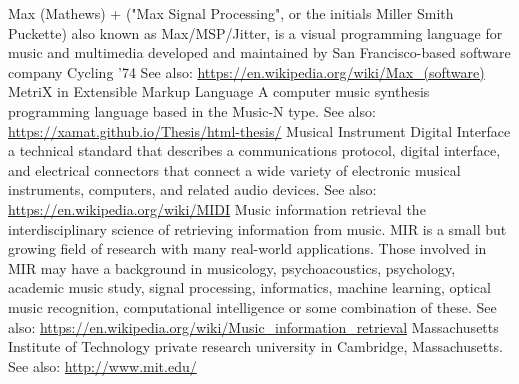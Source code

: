 	{Max (Mathews) + ("Max Signal Processing", or the initials Miller Smith Puckette)}
	{also known as Max/MSP/Jitter, is a visual programming language for music and multimedia developed and maintained by San Francisco-based software company Cycling '74 See also: \url{https://en.wikipedia.org/wiki/Max_(software)}}
	{MetriX in Extensible Markup Language}
	{A computer music synthesis programming language based in the Music-N type. See also: \url{https://xamat.github.io/Thesis/html-thesis/} \cite{Amatriain/2004/phdthesis}}
	{Musical Instrument Digital Interface}
	{ a technical standard that describes a communications protocol, digital interface, and electrical connectors that connect a wide variety of electronic musical instruments, computers, and related audio devices. See also: \url{https://en.wikipedia.org/wiki/MIDI}}
	{Music information retrieval }
	{the interdisciplinary science of retrieving information from music. MIR is a small but growing field of research with many real-world applications. Those involved in MIR may have a background in musicology, psychoacoustics, psychology, academic music study, signal processing, informatics, machine learning, optical music recognition, computational intelligence or some combination of these. See also: \url{https://en.wikipedia.org/wiki/Music_information_retrieval}}
	{Massachusetts Institute of Technology }
	{ private research university in Cambridge, Massachusetts. See also: \url{http://www.mit.edu/}}
